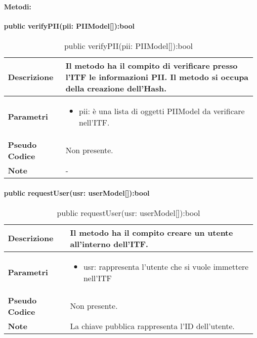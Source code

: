 \paragraph{Metodi:}


\paragraph{public verifyPII(pii: PIIModel[]):bool}
\begin{center}
    \begin{longtable}{|p{3cm}|p{9cm}|}%
    \caption{public verifyPII(pii: PIIModel[]):bool}
    \endfirsthead
    \endhead
    \hline
    \textbf{Descrizione} & Il metodo ha il compito di verificare presso l’ITF le informazioni PII. Il metodo si occupa della creazione dell’Hash.\\
    \hline
    \textbf{Parametri} &      
    \begin{itemize}
        \item pii: è una lista di oggetti PIIModel da verificare nell’ITF.
    \end{itemize}
    \\
    \hline
    \textbf{Pseudo Codice} & 
    Non presente.
    \\
    \hline
    \textbf{Note} & 
    -
    \\
    \hline
    \end{longtable}
    \end{center}



\paragraph{public requestUser(usr: userModel[]):bool}
\begin{center}
    \begin{longtable}{|p{3cm}|p{9cm}|}%
    \caption{public requestUser(usr: userModel[]):bool}
    \endfirsthead
    \endhead
    \hline
    \textbf{Descrizione} & Il metodo ha il compito creare un utente all’interno dell’ITF.\\
    \hline
    \textbf{Parametri} &      
    \begin{itemize}
        \item usr: rappresenta l’utente che si vuole immettere nell’ITF
    \end{itemize}
    \\
    \hline
    \textbf{Pseudo Codice} & 
    Non presente.
    \\
    \hline
    \textbf{Note} & 
    La chiave pubblica rappresenta l’ID dell’utente.
    \\
    \hline
    \end{longtable}
    \end{center}

